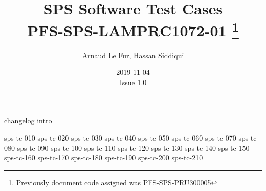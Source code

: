 \documentclass[12pt]{article}
\begin{document}
\title{\acrshort{SPS} Software Test Cases \\ \large PFS-SPS-LAMPRC1072-01 
\footnote{Previously document code assigned was PFS-SPS-PRU300005}}
\author{Arnaud Le Fur, Hassan Siddiqui}
\date{2019-11-04\\Issue 1.0}
\maketitle

\tableofcontents
\newpage

%
%
{changelog}
{intro}
\newpage

%
%
{sps-tc-010}
\newpage
{sps-tc-020}
\newpage
{sps-tc-030}
\newpage
{sps-tc-040}
\newpage
{sps-tc-050}
\newpage
{sps-tc-060}
\newpage
{sps-tc-070}
\newpage
{sps-tc-080}
\newpage
{sps-tc-090}
\newpage
{sps-tc-100}
\newpage
{sps-tc-110}
\newpage
{sps-tc-120}
\newpage
{sps-tc-130}
\newpage
{sps-tc-140}
\newpage
{sps-tc-150}
\newpage
{sps-tc-160}
\newpage
{sps-tc-170}
\newpage
{sps-tc-180}
\newpage
{sps-tc-190}
\newpage
{sps-tc-200}
\newpage
{sps-tc-210}
\newpage
%
%
\printglossary[type=\acronymtype]
\printglossary
\end{document}
